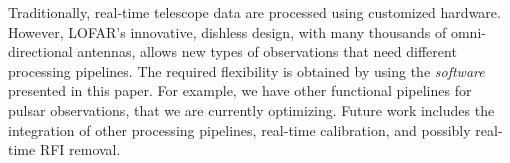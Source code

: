 \documentclass{sig-alternate}
\begin{document}
Traditionally, real-time telescope data are processed using customized hardware.
However, LOFAR's innovative, dishless design, with many thousands of
omni-directional antennas, allows new types of observations that need different
processing pipelines.
The required flexibility is obtained by using the \emph{software\/} presented
in this paper.
For example, we have other functional pipelines for pulsar observations, that
we are currently optimizing.
Future work includes the integration of other processing pipelines,
real-time calibration, and possibly real-time RFI removal.


%
\end{document}
